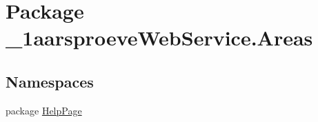 \hypertarget{namespace__1aarsproeve_web_service_1_1_areas}{}\section{Package \+\_\+1aarsproeve\+Web\+Service.\+Areas}
\label{namespace__1aarsproeve_web_service_1_1_areas}
\subsection*{Namespaces}
\begin{DoxyCompactItemize}
\item 
package \hyperlink{namespace__1aarsproeve_web_service_1_1_areas_1_1_help_page}{Help\+Page}
\end{DoxyCompactItemize}
